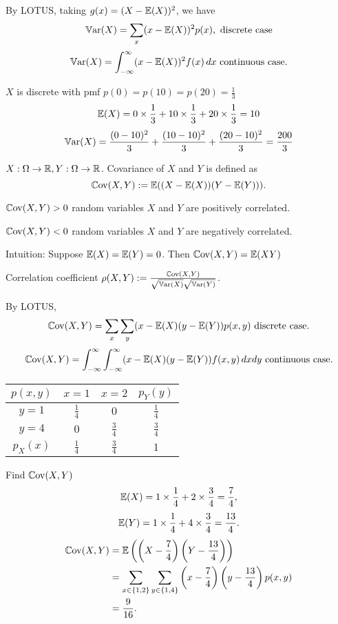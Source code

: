 \documentclass[10pt, a4paper]{article}
\begin{document}
By LOTUS,
taking $g(x) = (X - \mathbb{E}(X)) ^ 2$,
we have
\[
\mathbb{V}\mathrm{ar}(X) = \sum_{x}(x - \mathbb{E}(X)) ^ 2p(x), \text{ discrete case}
\]
\[
\mathbb{V}\mathrm{ar}(X) = \int_{-\infty}^{\infty}(x - \mathbb{E}(X)) ^ 2 f(x)\,dx\text{ continuous case}.
\]
\begin{example}
    $X$ is discrete with pmf $p(0) = p(10) = p(20) = \frac{1}{3}$
    \[
    \mathbb{E}(X) = 0 \times \frac{1}{3} + 10 \times \frac{1}{3} + 20 \times \frac{1}{3} = 10
    \]
    \[
    \mathbb{V}\mathrm{ar}(X) = \frac{(0 - 10) ^ 2}{3} + \frac{(10 - 10) ^ 2}{3} + \frac{(20 - 10) ^ 2}{3} = \frac{200}{3}
    \]
\end{example}

\begin{definition}
    $X : \Omega \rightarrow \mathbb{R}, Y : \Omega \rightarrow \mathbb{R}$.
    Covariance of $X$ and $Y$ is defined as
    \[
    \mathbb{C}\mathrm{ov}(X, Y) := \mathbb{E}((X - \mathbb{E}(X))(Y - \mathbb{E}(Y))).
    \]
\end{definition}

$\mathbb{C}\mathrm{ov}(X, Y) > 0$ random variables $X$ and $Y$ are positively correlated.

$\mathbb{C}\mathrm{ov}(X, Y) < 0$ random variables $X$ and $Y$ are negatively correlated.

Intuition:
Suppose $\mathbb{E}(X) = \mathbb{E}(Y) = 0$.
Then $\mathbb{C}\mathrm{ov}(X, Y) = \mathbb{E}(XY)$

Correlation coefficient $\rho(X, Y) := \frac{\mathbb{C}\mathrm{ov}(X, Y)}{\sqrt{\mathbb{V}\mathrm{ar}(X)}\sqrt{\mathbb{V}\mathrm{ar}(Y)}}$.

By LOTUS,
\[
\mathbb{C}\mathrm{ov}(X, Y) = \sum_{x}\sum_{y}(x - \mathbb{E}(X)(y - \mathbb{E}(Y))p(x, y)\text{ discrete case}.
\]
\[
\mathbb{C}\mathrm{ov}(X, Y) = \int_{-\infty}^{\infty}\int_{-\infty}^{\infty}(x - \mathbb{E}(X)(y - \mathbb{E}(Y))f(x, y)\,dxdy\text{ continuous case}.
\]

\begin{example}
    \begin{table}[H]
        \centering
        \begin{tabular}{c|cc|c}
             $p(x, y)$ & $x = 1$ & $x = 2$ & $p_Y(y)$ \\
             \hline
             $y = 1$ & $\frac{1}{4}$ & $0$ & $\frac{1}{4}$ \\
             $y = 4$ & $0$ & $\frac{3}{4}$ & $\frac{3}{4}$ \\
             \hline
             $p_X(x)$ & $\frac{1}{4}$ & $\frac{3}{4}$ & $1$
        \end{tabular}
    \end{table}
    Find $\mathbb{C}\mathrm{ov}(X, Y)$
    \[
    \mathbb{E}(X) = 1 \times \frac{1}{4} + 2 \times \frac{3}{4} = \frac{7}{4},
    \]
    \[
    \mathbb{E}(Y) = 1 \times \frac{1}{4} + 4 \times \frac{3}{4} = \frac{13}{4}.
    \]
    \begin{align*}
        \mathbb{C}\mathrm{ov}(X, Y) &= \mathbb{E}\left(\left(X - \frac{7}{4}\right)\left(Y - \frac{13}{4}\right)\right) \\
        &= \sum_{x \in \{1, 2\}}\sum_{y \in \{1, 4\}}\left(x - \frac{7}{4}\right)\left(y - \frac{13}{4}\right)p(x, y) \\
        &= \frac{9}{16}.
    \end{align*}
\end{example}
\end{document}

